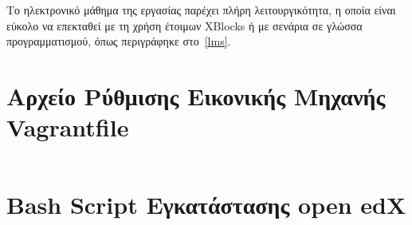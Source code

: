 \documentclass[12pt]{report}
\begin{document}
Το ηλεκτρονικό μάθημα της εργασίας παρέχει πλήρη λειτουργικότητα, η οποία είναι εύκολο να επεκταθεί με τη χρήση έτοιμων \textlatin{XBlocks} ή με σενάρια σε γλώσσα προγραμματισμού, όπως περιγράφηκε στο~\ref{lms}.

\begin{appendices}
\chapter{Αρχείο Ρύθμισης Εικονικής Μηχανής \textlatin{Vagrantfile}}\label{AppA}
\inputminted[linenos, fontsize=\scriptsize, breaklines, baselinestretch=1]{ruby}{sources/Vagrantfile}
\chapter{\textlatin{Bash Script} Εγκατάστασης \textlatin{open edX}}\label{AppB}
\inputminted[linenos, fontsize=\scriptsize, breaklines, baselinestretch=1]{bash}{sources/install_edx.sh}
\end{appendices}

\appendix



\end{document}
